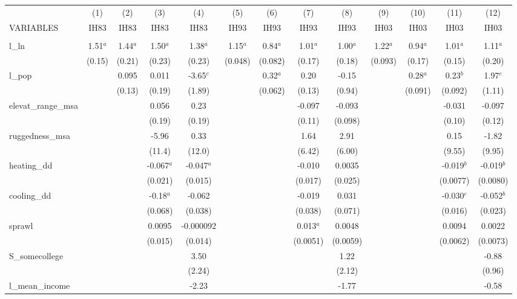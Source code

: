 \documentclass[]{article}
\begin{document}
\begin{tabular}{lcccccccccccc} \hline
 & (1) & (2) & (3) & (4) & (5) & (6) & (7) & (8) & (9) & (10) & (11) & (12) \\
VARIABLES & IH83 & IH83 & IH83 & IH83 & IH93 & IH93 & IH93 & IH93 & IH03 & IH03 & IH03 & IH03 \\ \hline
 &  &  &  &  &  &  &  &  &  &  &  &  \\
l\_ln & 1.51$^a$ & 1.44$^a$ & 1.50$^a$ & 1.38$^a$ & 1.15$^a$ & 0.84$^a$ & 1.01$^a$ & 1.00$^a$ & 1.22$^a$ & 0.94$^a$ & 1.01$^a$ & 1.11$^a$ \\
 & (0.15) & (0.21) & (0.23) & (0.23) & (0.048) & (0.082) & (0.17) & (0.18) & (0.093) & (0.17) & (0.15) & (0.20) \\
l\_pop &  & 0.095 & 0.011 & -3.65$^c$ &  & 0.32$^a$ & 0.20 & -0.15 &  & 0.28$^a$ & 0.23$^b$ & 1.97$^c$ \\
 &  & (0.13) & (0.19) & (1.89) &  & (0.062) & (0.13) & (0.94) &  & (0.091) & (0.092) & (1.11) \\
elevat\_range\_msa &  &  & 0.056 & 0.23 &  &  & -0.097 & -0.093 &  &  & -0.031 & -0.097 \\
 &  &  & (0.19) & (0.19) &  &  & (0.11) & (0.098) &  &  & (0.10) & (0.12) \\
ruggedness\_msa &  &  & -5.96 & 0.33 &  &  & 1.64 & 2.91 &  &  & 0.15 & -1.82 \\
 &  &  & (11.4) & (12.0) &  &  & (6.42) & (6.00) &  &  & (9.55) & (9.95) \\
heating\_dd &  &  & -0.067$^a$ & -0.047$^a$ &  &  & -0.010 & 0.0035 &  &  & -0.019$^b$ & -0.019$^b$ \\
 &  &  & (0.021) & (0.015) &  &  & (0.017) & (0.025) &  &  & (0.0077) & (0.0080) \\
cooling\_dd &  &  & -0.18$^a$ & -0.062 &  &  & -0.019 & 0.031 &  &  & -0.030$^c$ & -0.052$^b$ \\
 &  &  & (0.068) & (0.038) &  &  & (0.038) & (0.071) &  &  & (0.016) & (0.023) \\
sprawl &  &  & 0.0095 & -0.000092 &  &  & 0.013$^a$ & 0.0048 &  &  & 0.0094 & 0.0022 \\
 &  &  & (0.015) & (0.014) &  &  & (0.0051) & (0.0059) &  &  & (0.0062) & (0.0073) \\
S\_somecollege &  &  &  & 3.50 &  &  &  & 1.22 &  &  &  & -0.88 \\
 &  &  &  & (2.24) &  &  &  & (2.12) &  &  &  & (0.96) \\
l\_mean\_income &  &  &  & -2.23 &  &  &  & -1.77 &  &  &  & -0.58 \\

\end{tabular}
\end{document}

